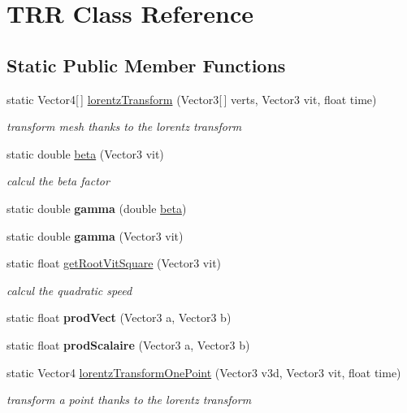 \hypertarget{class_t_r_r}{\section{T\+R\+R Class Reference}
\label{class_t_r_r}
}
\subsection*{Static Public Member Functions}
\begin{DoxyCompactItemize}
\item 
static Vector4\mbox{[}$\,$\mbox{]} \hyperlink{class_t_r_r_ae8628180186430f864791acdf278a015}{lorentz\+Transform} (Vector3\mbox{[}$\,$\mbox{]} verts, Vector3 vit, float time)
\begin{DoxyCompactList}\small\item\em transform mesh thanks to the lorentz transform \end{DoxyCompactList}\item 
static double \hyperlink{class_t_r_r_adf08f912bf67439db635b288c4a0dbe7}{beta} (Vector3 vit)
\begin{DoxyCompactList}\small\item\em calcul the beta factor \end{DoxyCompactList}\item 
\hypertarget{class_t_r_r_a3a29d4474e8b383755a4cebe6bdd6194}{static double {\bfseries gamma} (double \hyperlink{class_t_r_r_adf08f912bf67439db635b288c4a0dbe7}{beta})}\label{class_t_r_r_a3a29d4474e8b383755a4cebe6bdd6194}

\item 
\hypertarget{class_t_r_r_aaeb3732d6d090364c1cee47eb982ee5e}{static double {\bfseries gamma} (Vector3 vit)}\label{class_t_r_r_aaeb3732d6d090364c1cee47eb982ee5e}

\item 
static float \hyperlink{class_t_r_r_a00a06961349f0ea35332fe801e1a94df}{get\+Root\+Vit\+Square} (Vector3 vit)
\begin{DoxyCompactList}\small\item\em calcul the quadratic speed \end{DoxyCompactList}\item 
\hypertarget{class_t_r_r_ab12942d7e5c0737a3440202beda7deb2}{static float {\bfseries prod\+Vect} (Vector3 a, Vector3 b)}\label{class_t_r_r_ab12942d7e5c0737a3440202beda7deb2}

\item 
\hypertarget{class_t_r_r_a79fc59368ccc37b4ec430d71832c2c0b}{static float {\bfseries prod\+Scalaire} (Vector3 a, Vector3 b)}\label{class_t_r_r_a79fc59368ccc37b4ec430d71832c2c0b}

\item 
static Vector4 \hyperlink{class_t_r_r_a7b3d0fc743d2e65f344e057ec61bb354}{lorentz\+Transform\+One\+Point} (Vector3 v3d, Vector3 vit, float time)
\begin{DoxyCompactList}\small\item\em transform a point thanks to the lorentz transform \end{DoxyCompactList}\end{DoxyCompactItemize}

